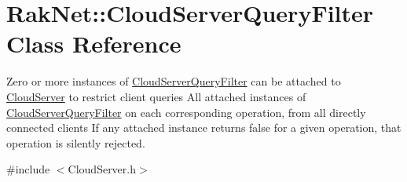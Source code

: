 \hypertarget{class_rak_net_1_1_cloud_server_query_filter}{\section{Rak\-Net\-:\-:Cloud\-Server\-Query\-Filter Class Reference}
\label{class_rak_net_1_1_cloud_server_query_filter}
}


Zero or more instances of \hyperlink{class_rak_net_1_1_cloud_server_query_filter}{Cloud\-Server\-Query\-Filter} can be attached to \hyperlink{class_rak_net_1_1_cloud_server}{Cloud\-Server} to restrict client queries All attached instances of \hyperlink{class_rak_net_1_1_cloud_server_query_filter}{Cloud\-Server\-Query\-Filter} on each corresponding operation, from all directly connected clients If any attached instance returns false for a given operation, that operation is silently rejected.  




{\ttfamily \#include $<$Cloud\-Server.\-h$>$}

